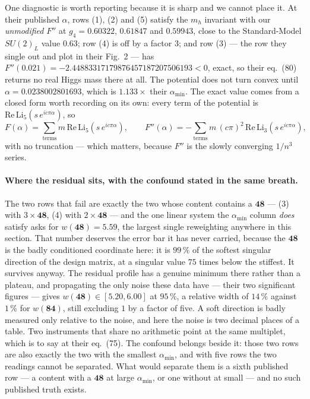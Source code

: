 \documentclass[11pt,a4paper]{article}
\newcommand{\su}[1]{SU(#1)}
\newcommand{\rep}[1]{\mathbf{#1}}
\newcommand{\amin}{\alpha_{\min}}
\begin{document}
One diagnostic is worth reporting because it is sharp and we cannot place it. At their published
$\alpha$, rows (1), (2) and (5) satisfy the $m_h$ invariant with our \emph{unmodified} $F''$ at
$g_4=0.60322$, $0.61847$ and $0.59943$, close to the Standard-Model $\su2_L$ value $0.63$; row (4) is off
by a
factor 3; and row (3) --- the row they single out and plot in their Fig.~2 --- has
$F''(0.021)=-2.44883317179876457187207506193<0$, exact, so their eq.~(80) returns no real Higgs mass
there at all. The potential does not turn convex until $\alpha=0.0238002801693$, which is
$1.133\times$ their $\amin$.
The exact value comes from a closed form worth recording on its own: every term of the potential is
$\mathrm{Re}\,\mathrm{Li}_5\!\left(s\,e^{ic\pi\alpha}\right)$, so
\[
F(\alpha)=\sum_{\text{terms}}m\,\mathrm{Re}\,\mathrm{Li}_5\!\left(s\,e^{ic\pi\alpha}\right),
\qquad
F''(\alpha)=-\sum_{\text{terms}}m\,(c\pi)^2\,\mathrm{Re}\,\mathrm{Li}_3\!\left(s\,e^{ic\pi\alpha}\right),
\]
with no truncation --- which matters, because $F''$ is the slowly converging $1/n^3$ series.

\paragraph{Where the residual sits, with the confound stated in the same breath.} The two rows that
fail are exactly the two whose content contains a $\rep{48}$ --- (3) with $3\times\rep{48}$, (4) with
$2\times\rep{48}$ --- and the one linear system the $\amin$ column \emph{does} satisfy asks for
$w(\rep{48})=5.59$, the largest single reweighting anywhere in this section. That number deserves the
error bar it has never carried, because the $\rep{48}$ is the badly conditioned coordinate here: it
is $99\,\%$ of the softest singular direction of the design matrix, at a singular value $75$ times
below the stiffest. It survives anyway. The residual profile has a genuine minimum there rather than
a plateau, and propagating the only noise these data have --- their two significant figures ---
gives $w(\rep{48})\in[5.20,6.00]$ at $95\,\%$, a relative width of $14\,\%$ against $1\,\%$ for
$w(\rep{84})$, still excluding $1$ by a factor of five. A soft direction is badly measured only
relative to the noise, and here the noise is two decimal places of a table. Two instruments that
share no arithmetic point at the same multiplet, which is to say at their eq.~(75). The confound
belongs beside it: those two rows are also exactly the two with the smallest $\amin$, and with five
rows the two readings cannot be separated. What would separate them is a sixth published row --- a
content with a $\rep{48}$ at large $\amin$, or one without at small --- and no such published truth
exists.
\end{document}
